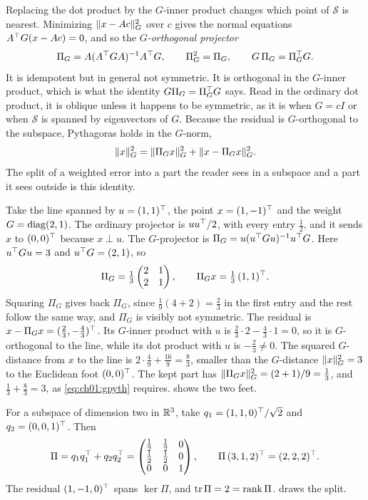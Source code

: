 Replacing the dot product by the $G$-inner product changes which point of
$\mathcal S$ is nearest. Minimizing $\lVert x-Ac\rVert_G^2$ over $c$ gives the normal
equations $A^{\top} G(x-Ac)=0$, and so the \emph{$G$-orthogonal projector}
\begin{equation}\label{eq:ch01:gproj}
\Pi_G = A(A^{\top} GA)^{-1}A^{\top} G,\qquad \Pi_G^2=\Pi_G,\qquad G\,\Pi_G=\Pi_G^{\top} G .
\end{equation}
It is idempotent but in general not symmetric. It is orthogonal in the
$G$-inner product, which is what the identity $G\Pi_G=\Pi_G^{\top} G$ says. Read
in the ordinary dot product, it is oblique unless it happens to be symmetric,
as it is when $G=cI$ or when $\mathcal S$ is spanned by eigenvectors of $G$. Because the residual is
$G$-orthogonal to the subspace, Pythagoras holds in the $G$-norm,
\begin{equation}\label{eq:ch01:gpyth}
\lVert x\rVert_G^2=\lVert \Pi_Gx\rVert_G^2+\lVert x-\Pi_Gx\rVert_G^2 .
\end{equation}
The split of a weighted error into a part the reader sees in a subspace and a
part it sees outside is this identity.

\begin{example}\label{ex:ch01:gproj}
Take the line spanned by $u=(1,1)^{\top}$, the point $x=(1,-1)^{\top}$ and the weight
$G=\operatorname{diag}(2,1)$. The ordinary projector is $uu^{\top}/2$, with every entry
$\tfrac12$, and it sends $x$ to $(0,0)^{\top}$ because $x\perp u$. The
$G$-projector is $\Pi_G=u(u^{\top} Gu)^{-1}u^{\top} G$. Here $u^{\top} Gu=3$ and
$u^{\top} G=(2,1)$, so
\[
\Pi_G=\tfrac13\begin{pmatrix}2&1\\2&1\end{pmatrix},\qquad
\Pi_G x=\tfrac13\,(1,1)^{\top} .
\]
Squaring $\Pi_G$ gives back $\Pi_G$, since $\tfrac19(4+2)=\tfrac23$ in the
first entry and the rest follow the same way, and $\Pi_G$ is visibly not
symmetric. The residual is $x-\Pi_Gx=(\tfrac23,-\tfrac43)^{\top}$. Its $G$-inner
product with $u$ is $\tfrac23\cdot2-\tfrac43\cdot1=0$, so it is $G$-orthogonal
to the line, while its dot product with $u$ is $-\tfrac23\neq0$. The squared
$G$-distance from $x$ to the line is $2\cdot\tfrac49+\tfrac{16}9=\tfrac83$,
smaller than the $G$-distance $\lVert x\rVert_G^2=3$ to the Euclidean foot $(0,0)^{\top}$.
The kept part has $\lVert \Pi_Gx\rVert_G^2=(2+1)/9=\tfrac13$, and
$\tfrac13+\tfrac83=3$, as \cref{eq:ch01:gpyth} requires.
 shows the two feet.

For a subspace of dimension two in $\mathbb{R}^3$, take $q_1=(1,1,0)^{\top}/\sqrt2$ and
$q_2=(0,0,1)^{\top}$. Then
\[
\Pi=q_1q_1^{\top}+q_2q_2^{\top}=\begin{pmatrix}\tfrac12&\tfrac12&0\\ \tfrac12&\tfrac12&0\\ 0&0&1\end{pmatrix},
\qquad \Pi\,(3,1,2)^{\top}=(2,2,2)^{\top} .
\]
The residual $(1,-1,0)^{\top}$ spans $\ker\Pi$, and $\operatorname{tr}\Pi=2=\operatorname{rank}\Pi$.
 draws the split.
\end{example}

